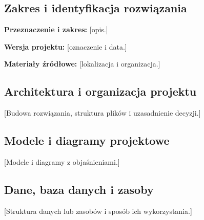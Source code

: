 \documentclass[11pt,a4paper,oneside]{article}
\newif\ifpodpowiedzi
\newcommand{\podpowiedz}[1]{\ifpodpowiedzi\par\begingroup\small\color{hintcolor}\textit{Wskazówka: #1}\par\endgroup\fi}
\newcommand{\pole}[1]{\textnormal{[#1]}}
\begin{document}
\subsection{Zakres i identyfikacja rozwiązania}
\podpowiedz{Opisz przeznaczenie projektu, najważniejsze wymagania oraz wersję, której dotyczy dokumentacja. Wskaż, gdzie znajdują się pliki źródłowe i zasoby: repozytorium dla projektu programistycznego lub inne miejsce uzgodnione z prowadzącymi. Podaj commit, tag albo oznaczenie wersji plików.}
\textbf{Przeznaczenie i zakres:} \pole{opis.}\par
\textbf{Wersja projektu:} \pole{oznaczenie i data.}\par
\textbf{Materiały źródłowe:} \pole{lokalizacja i organizacja.}

\newpage
\subsection{Architektura i organizacja projektu}
\podpowiedz{Przedstaw główne elementy rozwiązania, ich odpowiedzialności i powiązania. Dla aplikacji opisz komponenty i przepływ danych; dla animacji 3D -- organizację scen, obiektów, zasobów i etapów przetwarzania. Wyjaśnij najważniejsze decyzje i zależności. Dodaj schemat, jeśli pomaga zrozumieć rozwiązanie.}
\pole{Budowa rozwiązania, struktura plików i uzasadnienie decyzji.}

\subsection{Modele i diagramy projektowe}
\podpowiedz{Dobierz diagramy do projektu. Dla oprogramowania mogą to być diagramy UML: klas, przypadków użycia, sekwencji, stanów lub komponentów. Dla innych projektów wykorzystaj np. schemat sceny, storyboard lub diagram procesu. Każdy rysunek opatrz podpisem i omów w tekście, stosując odwołania przez \texttt{\textbackslash ref}. Nie twórz diagramów wyłącznie w celu wypełnienia szablonu.}
\pole{Modele i diagramy z objaśnieniami.}

\subsection{Dane, baza danych i zasoby}
\podpowiedz{Jeśli projekt korzysta z bazy danych, opisz schemat, tabele, klucze, relacje, ograniczenia i istotne procedury. Dla innych danych lub zasobów określ formaty, strukturę, pochodzenie oraz sposób przygotowania i wykorzystania. Dla animacji mogą to być modele, tekstury, materiały i pliki dźwiękowe. Wskaż zasoby własne i zewnętrzne oraz warunki ich wykorzystania.}
\pole{Struktura danych lub zasobów i sposób ich wykorzystania.}
\end{document}
